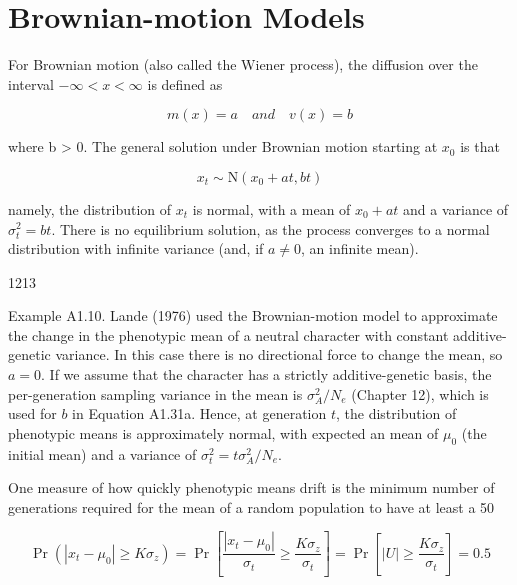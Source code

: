 \documentclass{article}
\begin{document}
\section{Brownian-motion Models}
For Brownian motion (also called the Wiener process), the diffusion over the interval  $ -\infty < x < \infty $ is defined as

\begin{equation}
m(x)=a\quad and\quad v(x)=b
\end{equation}

where b > 0. The general solution under Brownian motion starting at  $ x_{0} $ is that

\begin{equation}
x_{t}\sim\mathrm{N}(x_{0}+at,bt)
\end{equation}

namely, the distribution of  $ x_t $ is normal, with a mean of  $ x_0 + at $ and a variance of  $ \sigma_t^2 = bt $. There is no equilibrium solution, as the process converges to a normal distribution with infinite variance (and, if  $ a \neq 0 $, an infinite mean).

1213

Example A1.10. Lande (1976) used the Brownian-motion model to approximate the change in the phenotypic mean of a neutral character with constant additive-genetic variance. In this case there is no directional force to change the mean, so $a = 0$. If we assume that the character has a strictly additive-genetic basis, the per-generation sampling variance in the mean is $\sigma_A^2 / N_e$ (Chapter 12), which is used for $b$ in Equation A1.31a. Hence, at generation $t$, the distribution of phenotypic means is approximately normal, with expected an mean of $\mu_0$ (the initial mean) and a variance of $\sigma_t^2 = t \sigma_A^2 / N_e$.

One measure of how quickly phenotypic means drift is the minimum number of generations required for the mean of a random population to have at least a 50%

\begin{equation}
\Pr(|x_{t}-\mu_{0}|\geq K\sigma_{z})=\Pr\left[\frac{|x_{t}-\mu_{0}|}{\sigma_{t}}\geq\frac{K\sigma_{z}}{\sigma_{t}}\right]=\Pr\left[|U|\geq\frac{K\sigma_{z}}{\sigma_{t}}\right]=0.5
\end{equation}
\end{document}
